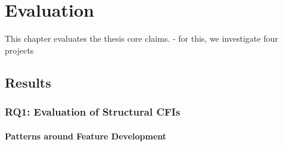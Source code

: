 \chapter{Evaluation}\label{ch:evaluation}

This chapter evaluates the thesis core claims.
- for this, we investigate four projects

\section{Results}\label{sec:results}

\subsection*{\textbf{RQ1: Evaluation of Structural CFIs}}\label{sec:eval_struc_cfis}

\subsubsection*{Patterns around Feature Development}\label{sec:eval_feature_development}

